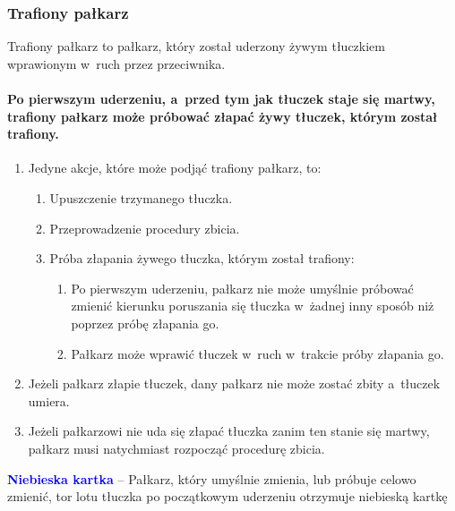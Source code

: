 \documentclass[12pt]{article}
\newcommand\bluecard[1]{\bgroup\textcolor{blue}{\textbf{#1}}}
\begin{document}
\subsubsection{Trafiony pałkarz}

Trafiony pałkarz to pałkarz, który został uderzony żywym tłuczkiem
wprawionym w~ruch przez przeciwnika.

\paragraph{Po pierwszym uderzeniu, a~przed tym jak tłuczek staje
	się martwy, trafiony pałkarz może próbować złapać żywy tłuczek, którym
	został trafiony.}

\begin{enumerate}
	\item
	      Jedyne akcje, które może podjąć trafiony pałkarz, to:

	      \begin{enumerate}
		      \item
		            Upuszczenie trzymanego tłuczka.
		      \item
		            Przeprowadzenie procedury zbicia.
		      \item
		            Próba złapania żywego tłuczka, którym został trafiony:

		            \begin{enumerate}
			            \item
			                  Po pierwszym uderzeniu, pałkarz nie może umyślnie próbować zmienić
			                  kierunku poruszania się tłuczka w~żadnej inny sposób niż poprzez
			                  próbę złapania go.
			            \item
			                  Pałkarz może wprawić tłuczek w~ruch w~trakcie próby złapania go.
		            \end{enumerate}
	      \end{enumerate}
	\item
	      Jeżeli pałkarz złapie tłuczek, dany pałkarz nie może zostać zbity a~tłuczek umiera.
	\item
	      Jeżeli pałkarzowi nie uda się złapać tłuczka zanim ten stanie się
	      martwy, pałkarz musi natychmiast rozpocząć procedurę zbicia.
\end{enumerate}

\bluecard{Niebieska kartka} -- Pałkarz, który umyślnie zmienia, lub próbuje
celowo zmienić, tor lotu tłuczka po początkowym uderzeniu otrzymuje
niebieską kartkę
\end{document}
